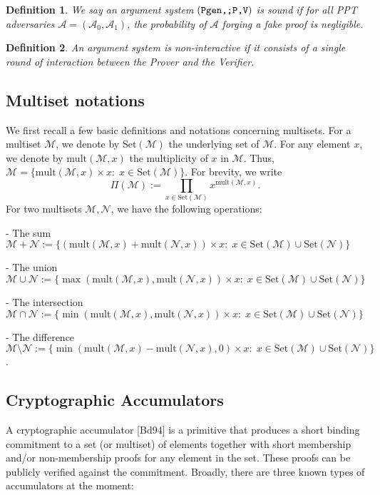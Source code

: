 \documentclass[11pt, lettersize, notitlepage, leqno, footskip=0.6cm]{article}
\newcommand{\pl}{\prod\limits}
\newcommand{\sett}{\mr{Set}}
\newcommand{\mult}{\mr{mult}}
\newcommand{\mul}{\mr{mult}}
\newcommand{\mc}{\mathcal}
\newcommand{\mr}{\mathrm}
\newcommand{\sm}{\setminus}
\newcommand{\vs}{\vspace{-0.15cm}}
\newcommand{\noin}{\noindent}
\newtheorem{Def}{Definition}[section]
\numberwithin{equation}{section}
\begin{document}
\begin{Def} \normalfont We say an argument system $\protect{(\verb|Pgen,;P,V|)}$ is \textit{sound} if for all PPT adversaries $\mc{A} = (\mc{A}_0, \mc{A}_1)$, the probability of $\mc{A}$ forging a fake proof is negligible.\end{Def}

\begin{Def} \normalfont An argument system is \textit{non-interactive} if it consists of a single round of interaction between the Prover and the Verifier.\end{Def}

\subsection{\fontsize{11}{11}\selectfont Multiset notations}


We first recall a few basic definitions and notations concerning multisets. For a multiset $\mc{M}$, we denote by $\sett(\mc{M})$ the underlying set of $\mc{M}$. For any element $x$, we denote by $\mul(\mc{M},x)$ the multiplicity of $x$ in $\mc{M}$. Thus, $\mc{M} = \{ \mult(\mc{M},x)\times x: \; x\in \sett(\mc{M})\}$. For brevity, we write \vs $$\Pi(\mc{M}):= \pl_{x\in \sett(\mc{M})} x^{\mult(\mc{M},x)}.$$ For two multisets $\mc{M}, \mc{N}$, we have the following operations:\vspace{0.1cm}

\noin - The sum $\mc{M}+\mc{N} := \{(\mul(\mc{M},x)+\mul(\mc{N},x))\times x:\;x\in \sett(\mc{M})\cup\sett(\mc{N}) \}$

\noin - The union $\mc{M}\cup \mc{N} := \{\max(\mul(\mc{M},x),\mul(\mc{N},x))\times x:\;x\in \sett(\mc{M})\cup\sett(\mc{N})\}$

\noin - The intersection $\mc{M}\cap \mc{N} := \{\min(\mul(\mc{M},x),\mul(\mc{N},x))\times x:\;x\in \sett(\mc{M})\cup\sett(\mc{N})\}$

\noin - The difference $\mc{M}\sm \mc{N} := \{\min(\mul(\mc{M},x)-\mul(\mc{N},x), 0)\times x:\;x\in \sett(\mc{M})\cup\sett(\mc{N})\}$.


\subsection{\fontsize{11}{11}\selectfont Cryptographic Accumulators }

A cryptographic accumulator [Bd94] is a primitive that produces a short binding commitment to a set (or multiset) of elements together with short membership and/or non-membership proofs for any element in the set. These proofs can be publicly verified against the commitment. Broadly, there are three known types of accumulators at the moment: 
\end{document}

